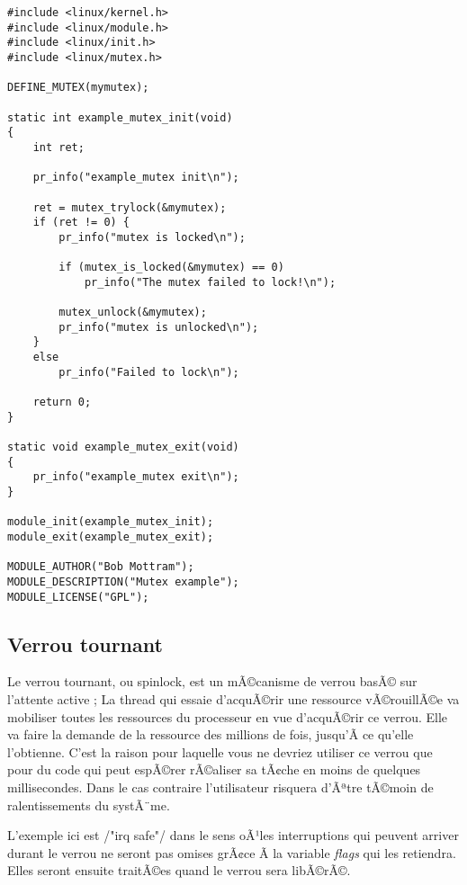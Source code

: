 \documentclass[11pt]{article}
\begin{document}
\begin{verbatim}
#include <linux/kernel.h>
#include <linux/module.h>
#include <linux/init.h>
#include <linux/mutex.h>

DEFINE_MUTEX(mymutex);

static int example_mutex_init(void)
{
    int ret;

    pr_info("example_mutex init\n");

    ret = mutex_trylock(&mymutex);
    if (ret != 0) {
        pr_info("mutex is locked\n");

        if (mutex_is_locked(&mymutex) == 0)
            pr_info("The mutex failed to lock!\n");

        mutex_unlock(&mymutex);
        pr_info("mutex is unlocked\n");
    }
    else
        pr_info("Failed to lock\n");

    return 0;
}

static void example_mutex_exit(void)
{
    pr_info("example_mutex exit\n");
}

module_init(example_mutex_init);
module_exit(example_mutex_exit);

MODULE_AUTHOR("Bob Mottram");
MODULE_DESCRIPTION("Mutex example");
MODULE_LICENSE("GPL");
\end{verbatim}

\subsection*{Verrou tournant}
\label{sec-12-2}

Le verrou tournant, ou spinlock, est un mÃ©canisme de verrou basÃ© sur l'attente active ; La thread qui essaie d'acquÃ©rir une ressource vÃ©rouillÃ©e va mobiliser toutes les ressources du processeur en vue d'acquÃ©rir ce verrou. Elle va faire la demande de la ressource des millions de fois, jusqu'Ã  ce qu'elle l'obtienne. C'est la raison pour laquelle vous ne devriez utiliser ce verrou que pour du code qui peut espÃ©rer rÃ©aliser sa tÃ¢che en moins de quelques millisecondes. Dans le cas contraire l'utilisateur risquera d'Ãªtre tÃ©moin de ralentissements du systÃ¨me.

L'exemple ici est /"irq safe"/ dans le sens oÃ¹les interruptions qui peuvent arriver durant le verrou ne seront pas omises grÃ¢ce Ã  la variable \emph{flags} qui les retiendra. Elles seront ensuite traitÃ©es quand le verrou sera libÃ©rÃ©.
\end{document}
